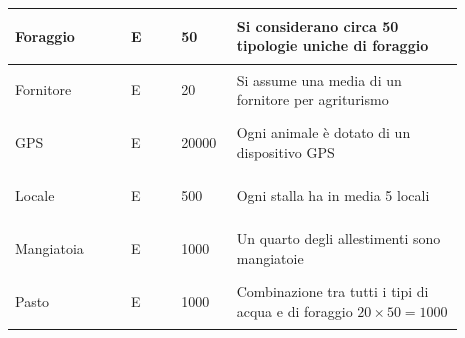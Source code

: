 \documentclass[12pt,a4paper]{article}
\begin{document}
\begin{center}
\begin{longtable}{|p{0.23\linewidth}|p{0.1\linewidth}|p{0.11\linewidth}|p{0.45\linewidth}|}
\hline
Foraggio 				& \begin{center}
\vspace{-25pt}E
\end{center}
					& \begin{center}
					\vspace{-25pt}50\end{center}
					&  Si considerano circa 50 tipologie uniche di foraggio \\ 

\hline
Fornitore 				& \begin{center}
\vspace{-25pt}E
\end{center}
					& \begin{center}
					\vspace{-25pt}20\end{center}
					&  Si assume una media di un fornitore per agriturismo \\ 

\hline
GPS 				& \begin{center}
\vspace{-25pt}E
\end{center}
					& \begin{center}
					\vspace{-25pt}20000\end{center}
					&  Ogni animale è dotato di un dispositivo GPS \\ 

\hline
Locale 				& \begin{center}
\vspace{-25pt}E
\end{center}
					& \begin{center}
					\vspace{-25pt}500\end{center}
					&  Ogni stalla ha in media 5 locali \\ 

\hline
Mangiatoia			& \begin{center}
\vspace{-25pt}E
\end{center}
					& \begin{center}
					\vspace{-25pt}1000\end{center}
					& Un quarto degli allestimenti sono mangiatoie \\
\hline
Pasto 				& \begin{center}
\vspace{-25pt}E
\end{center}
					& \begin{center}
					\vspace{-25pt}1000\end{center}
					&  Combinazione tra tutti i tipi di acqua e di foraggio $20\times 50= 1000$ \\ 


\end{longtable}
\end{center}
\end{document}
